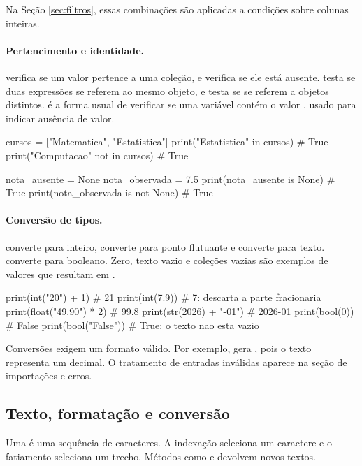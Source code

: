 Na Seção \ref{sec:filtros}, essas combinações são aplicadas a condições sobre colunas inteiras.

\paragraph{Pertencimento e identidade.}
 verifica se um valor pertence a uma coleção, e  verifica se ele está ausente.  testa se duas expressões se referem ao mesmo objeto, e  testa se se referem a objetos distintos.  é a forma usual de verificar se uma variável contém o valor , usado para indicar ausência de valor.

\begin{exemplo}
cursos = ["Matematica", "Estatistica"]
print("Estatistica" in cursos)    # True
print("Computacao" not in cursos) # True

nota_ausente = None
nota_observada = 7.5
print(nota_ausente is None)       # True
print(nota_observada is not None) # True
\end{exemplo}

\paragraph{Conversão de tipos.}
 converte para inteiro,  converte para ponto flutuante e  converte para texto.  converte para booleano. Zero, texto vazio e coleções vazias são exemplos de valores que resultam em .

\begin{exemplo}
print(int("20") + 1)       # 21
print(int(7.9))            # 7: descarta a parte fracionaria
print(float("49.90") * 2)  # 99.8
print(str(2026) + "-01")   # 2026-01
print(bool(0))             # False
print(bool("False"))       # True: o texto nao esta vazio
\end{exemplo}

Conversões exigem um formato válido. Por exemplo,  gera , pois o texto representa um decimal. O tratamento de entradas inválidas aparece na seção de importações e erros.

\subsection{Texto, formatação e conversão}

Uma  é uma sequência de caracteres. A indexação seleciona um caractere e o fatiamento seleciona um trecho. Métodos como  e  devolvem novos textos.

